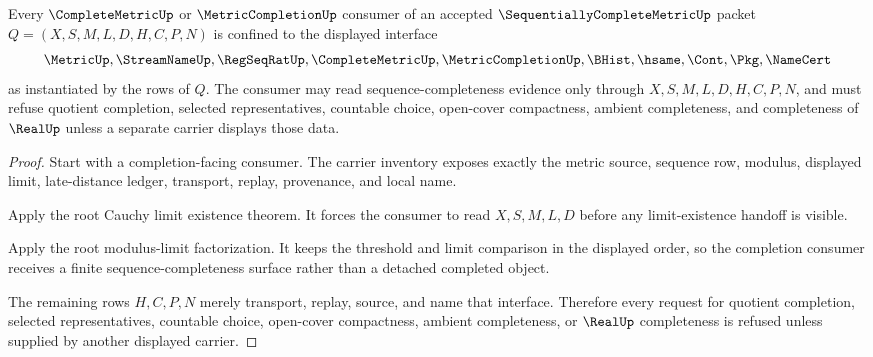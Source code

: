 \begin{theorem}
\label{thm:sequentially-complete-metric-root-completion-consumer-interface}
Every $\CompleteMetricUp$ or $\MetricCompletionUp$ consumer of an accepted $\SequentiallyCompleteMetricUp$ packet $Q=(X,S,M,L,D,H,C,P,N)$ is confined to the displayed interface
$$
\MetricUp,\StreamNameUp,\RegSeqRatUp,\CompleteMetricUp,\MetricCompletionUp,\BHist,\hsame,\Cont,\Pkg,\NameCert
$$
as instantiated by the rows of $Q$. The consumer may read sequence-completeness evidence only through $X,S,M,L,D,H,C,P,N$, and must refuse quotient completion, selected representatives, countable choice, open-cover compactness, ambient completeness, and completeness of $\RealUp$ unless a separate carrier displays those data.
\end{theorem}
\begin{proof}
Start with a completion-facing consumer. The carrier inventory exposes exactly the metric source, sequence row, modulus, displayed limit, late-distance ledger, transport, replay, provenance, and local name.

Apply the root Cauchy limit existence theorem. It forces the consumer to read $X,S,M,L,D$ before any limit-existence handoff is visible.

Apply the root modulus-limit factorization. It keeps the threshold and limit comparison in the displayed order, so the completion consumer receives a finite sequence-completeness surface rather than a detached completed object.

The remaining rows $H,C,P,N$ merely transport, replay, source, and name that interface. Therefore every request for quotient completion, selected representatives, countable choice, open-cover compactness, ambient completeness, or $\RealUp$ completeness is refused unless supplied by another displayed carrier.
\end{proof}

